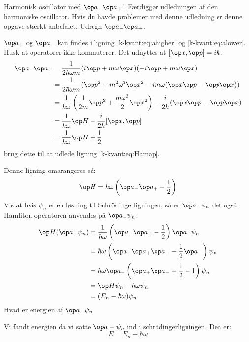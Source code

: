 \begin{opgave}{Harmonisk oscillator med $\op a_- \op a_+$}{1}
\label{kvant:opg:amap}
Færdiggør udledningen af den harmoniske oscillator. Hvis du havde problemer med denne udledning er denne opgave stærkt anbefalet.
\opg Udregn $\op a_-\op a_+$.

$\op a_+$ og $\op a_-$ kan findes i ligning \eqref{k-kvant:eq:ahigher} og \eqref{k-kvant:eq:alower}. Husk at operatorer ikke kommuterer. Det udnyttes at $[\op x,\op p] = i\hbar$.
\begin{align*}
    \op a_-\op a_+ &= \frac{1}{2\hbar\omega m}(i\op p+m\omega \op x)(-i\op p+m\omega \op x)\\
    &= \frac{1}{2\hbar\omega m}(\op p^2+m^2\omega^2\op x^2-im\omega(\op x\op p-\op p\op x))\\
    &= \frac{1}{\hbar \omega}\left(\frac{1}{2m}\op p^2+\frac{m\omega^2}{2}\op x^2\right)-\frac{i}{2\hbar}(\op x\op p-\op p\op x)\\
    &=\frac{1}{\hbar\omega}\op H-\frac{i}{2\hbar}[\op x,\op p]\\
    &=\frac{1}{\hbar\omega}\op H+\frac{1}{2}
\end{align*}
\opg brug dette til at udlede ligning \eqref{k-kvant:eq:Hamap}.

Denne ligning omarangeres så:
$$
\op H = \hbar\omega\left(\op a_-\op a_+-\frac{1}{2}\right)
$$
\opg Vis at hvis $\psi_n$ er en løsning til Schrödingerligningen, så er $\op a_-\psi_n$ det også.
Hamliton operatoren anvendes på $\op a_-\psi_n$:
\begin{align*}
    \op H(\op a_-\psi_n) &= \frac{1}{\hbar\omega}\left(\op a_- \op a_+ -\frac{1}{2}\right)\op a_-\psi_n\\
    &= {\hbar\omega}\left(\op a_-\op a_+\op a_- - \frac{1}{2}\op a_-\right)\psi_n\\
    &= {\hbar\omega}\op a_-\left(\op a_+\op a_-+\frac{1}{2}-1\right)\psi_n\\
    &= \op H\psi_n-\hbar\omega\psi_n\\
    &= (E_n-\hbar\omega)\psi_n
\end{align*}
\opg Hvad er energien af $\op a_- \psi_n$

Vi fandt energien da vi satte $\op a-\psi_n$ ind i schrödingerligningen. Den er:
$$
E=E_n-\hbar\omega
$$
\end{opgave}
